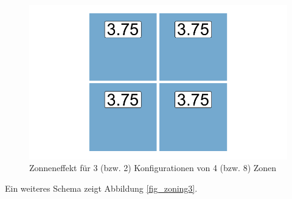 \begin{figure}[htb]
\begin{minipage}[b]{.32\linewidth}
    \end{minipage}
    \hfill
    \begin{minipage}[b]{.32\linewidth}
       \includegraphics[width=\linewidth,trim={0.5cm 0.5cm 0.5cm 0.5cm},clip]{body/figures/46-zon_c.pdf}
    \end{minipage}
    \caption[Zoneneffekt]{Zonneneffekt für 3 (bzw. 2) Konfigurationen von 4 (bzw. 8) Zonen }
    \label{fig_zoning2}
 \end{figure}

Ein weiteres Schema zeigt Abbildung \ref{fig_zoning3}.

